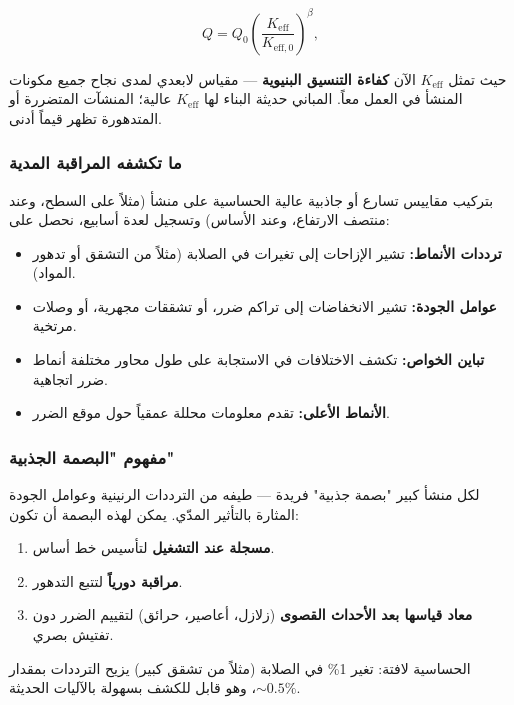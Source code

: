 \documentclass[12pt,a4paper]{article}
\theoremstyle{remark}
\begin{document}
	\begin{equation}
		Q = Q_0 \left( \frac{K_{\mathrm{eff}}}{K_{\mathrm{eff},0}} \right)^{\beta},
		\label{eq:structural-Q}
	\end{equation}
	
	حيث تمثل \(K_{\mathrm{eff}}\) الآن \textbf{كفاءة التنسيق البنيوية} — مقياس لابعدي لمدى نجاح جميع مكونات المنشأ في العمل معاً. المباني حديثة البناء لها \(K_{\mathrm{eff}}\) عالية؛ المنشآت المتضررة أو المتدهورة تظهر قيماً أدنى.
	
	\subsubsection{ما تكشفه المراقبة المدية}
	
	بتركيب مقاييس تسارع أو جاذبية عالية الحساسية على منشأ (مثلاً على السطح، وعند منتصف الارتفاع، وعند الأساس) وتسجيل لعدة أسابيع، نحصل على:
	
	\begin{itemize}
		\item \textbf{ترددات الأنماط:} تشير الإزاحات إلى تغيرات في الصلابة (مثلاً من التشقق أو تدهور المواد).
		\item \textbf{عوامل الجودة:} تشير الانخفاضات إلى تراكم ضرر، أو تشققات مجهرية، أو وصلات مرتخية.
		\item \textbf{تباين الخواص:} تكشف الاختلافات في الاستجابة على طول محاور مختلفة أنماط ضرر اتجاهية.
		\item \textbf{الأنماط الأعلى:} تقدم معلومات محللة عمقياً حول موقع الضرر.
	\end{itemize}
	
	\subsubsection{مفهوم "البصمة الجذبية"}
	
	لكل منشأ كبير "بصمة جذبية" فريدة — طيفه من الترددات الرنينية وعوامل الجودة المثارة بالتأثير المدّي. يمكن لهذه البصمة أن تكون:
	\begin{enumerate}
		\item \textbf{مسجلة عند التشغيل} لتأسيس خط أساس.
		\item \textbf{مراقبة دورياً} لتتبع التدهور.
		\item \textbf{معاد قياسها بعد الأحداث القصوى} (زلازل، أعاصير، حرائق) لتقييم الضرر دون تفتيش بصري.
	\end{enumerate}
	
	الحساسية لافتة: تغير 1\% في الصلابة (مثلاً من تشقق كبير) يزيح الترددات بمقدار \(\sim 0.5\%\)، وهو قابل للكشف بسهولة بالآليات الحديثة.
	
\end{document}
